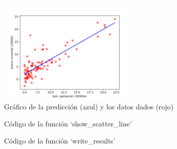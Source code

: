 \documentclass[6pt]{../../shared/AiTex}
\begin{document}
\begin{figure}[H]
    \centering
    \includegraphics[width=0.6\textwidth]{imagenes/scatter.png}
    \caption{Gráfico de la predicción (azul) y los datos dados (rojo)}
    \label{fig:scatter}
\end{figure}

\begin{figure}[H]
    \centering
    
    \caption{Código de la función `show\_scatter\_line'}
    \label{fig:show_scatter_line}
\end{figure}

\begin{figure}[H]
    \centering
    
    \caption{Código de la función `write\_results'}
    \label{fig:write_results}
\end{figure}
\end{document}
